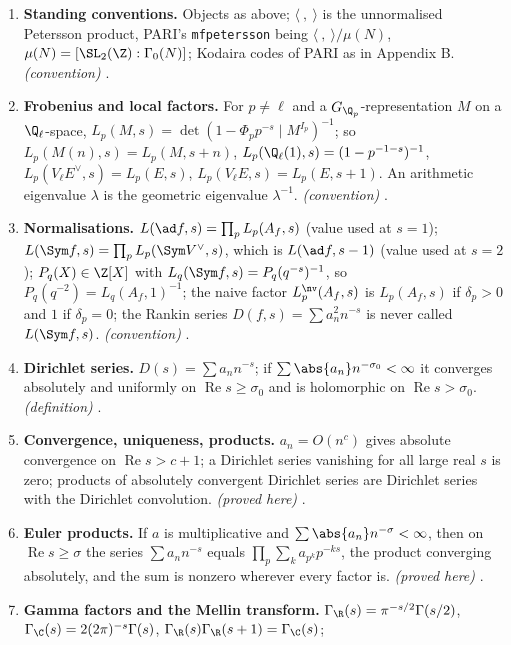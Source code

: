 \begin{enumerate}[label=\textbf{\thechapter.\arabic*}]
\item \textbf{Standing conventions.} Objects as above; $\langle\ ,\ \rangle$ is the unnormalised Petersson product, PARI's \texttt{mfpetersson} being
$\langle\ ,\ \rangle/\mu(N)$, $\mu(N)=[\SL_2(\Z):\Gamma_0(N)]$; Kodaira codes of PARI as in Appendix B. \emph{(convention)} .
\item \textbf{Frobenius and local factors.} For $p\ne\ell$ and a $G_{\Q_p}$-representation $M$ on a $\Q_\ell$-space,
$L_p(M,s)=\det(1-\Phi_pp^{-s}\mid M^{I_p})^{-1}$; so $L_p(M(n),s)=L_p(M,s+n)$, $L_p(\Q_\ell(1),s)=(1-p^{-1-s})^{-1}$, $L_p(V_\ell E^\vee,s)=L_p(E,s)$,
$L_p(V_\ell E,s)=L_p(E,s+1)$. An arithmetic eigenvalue $\lambda$ is the geometric eigenvalue $\lambda^{-1}$. \emph{(convention)} .
\item \textbf{Normalisations.} $L(\ad f,s)=\prod_pL_p(A_f,s)$ (value used at $s=1$); $L(\Sym f,s)=\prod_pL_p(\Sym V^\vee,s)$, which is $L(\ad f,s-1)$ (value used at $s=2$);
$P_q(X)\in\Z[X]$ with $L_q(\Sym f,s)=P_q(q^{-s})^{-1}$, so $P_q(q^{-2})=L_q(A_f,1)^{-1}$; the naive factor $L_p^{\nv}(A_f,s)$ is $L_p(A_f,s)$ if $\delta_p>0$ and
$1$ if $\delta_p=0$; the Rankin series $D(f,s)=\sum a_n^2n^{-s}$ is never called $L(\Sym f,s)$. \emph{(convention)} .
\item \textbf{Dirichlet series.} $D(s)=\sum a_nn^{-s}$; if $\sum\abs{a_n}n^{-\sigma_0}<\infty$ it converges absolutely and uniformly on $\operatorname{Re}s\ge\sigma_0$ and is holomorphic
on $\operatorname{Re}s>\sigma_0$. \emph{(definition)} .
\item \textbf{Convergence, uniqueness, products.} $a_n=O(n^c)$ gives absolute convergence on $\operatorname{Re}s>c+1$; a Dirichlet series vanishing for all large
real $s$ is zero; products of absolutely convergent Dirichlet series are Dirichlet series with the Dirichlet convolution. \emph{(proved here)}
.
\item \textbf{Euler products.} If $a$ is multiplicative and $\sum\abs{a_n}n^{-\sigma}<\infty$, then on $\operatorname{Re}s\ge\sigma$ the series $\sum a_nn^{-s}$ equals $\prod_p\sum_ka_{p^k}p^{-ks}$, the product
converging absolutely, and the sum is nonzero wherever every factor is. \emph{(proved here)} .
\item \textbf{Gamma factors and the Mellin transform.} $\Gamma_\R(s)=\pi^{-s/2}\Gamma(s/2)$, $\Gamma_\C(s)=2(2\pi)^{-s}\Gamma(s)$, $\Gamma_\R(s)\Gamma_\R(s+1)=\Gamma_\C(s)$;

\end{enumerate}

